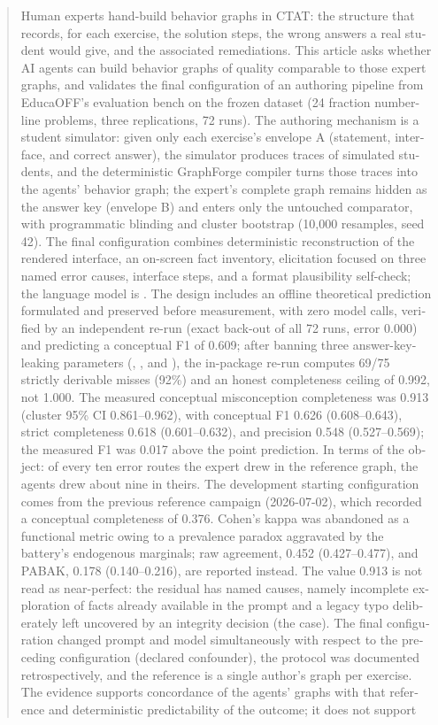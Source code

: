 \documentclass[11pt,a4paper]{article}
\begin{document}
\begin{otherlanguage}{english}
\renewcommand{\abstractname}{Abstract}
\begin{abstract}
Human experts hand-build behavior graphs in CTAT: the structure that records, for each exercise, the solution steps, the wrong answers a real student would give, and the associated remediations. This article asks whether AI agents can build behavior graphs of quality comparable to those expert graphs, and validates the final configuration of an authoring pipeline from EducaOFF's evaluation bench on the frozen dataset  (24 fraction number-line problems, three replications, 72 runs). The authoring mechanism is a student simulator: given only each exercise's envelope A (statement, interface, and correct answer), the simulator produces traces of simulated students, and the deterministic GraphForge compiler turns those traces into the agents' behavior graph; the expert's complete graph remains hidden as the answer key (envelope B) and enters only the untouched comparator, with programmatic blinding and cluster bootstrap (10,000 resamples, seed 42). The final configuration combines deterministic reconstruction of the rendered interface, an on-screen fact inventory, elicitation focused on three named error causes, interface steps, and a format plausibility self-check; the language model is . The design includes an offline theoretical prediction formulated and preserved before measurement, with zero model calls, verified by an independent re-run (exact back-out of all 72 runs, error 0.000) and predicting a conceptual F1 of 0.609; after banning three answer-key-leaking parameters (, , and ), the in-package re-run computes 69/75 strictly derivable misses (92\%) and an honest completeness ceiling of 0.992, not 1.000. The measured conceptual misconception completeness was 0.913 (cluster 95\% CI 0.861--0.962), with conceptual F1 0.626 (0.608--0.643), strict completeness 0.618 (0.601--0.632), and precision 0.548 (0.527--0.569); the measured F1 was 0.017 above the point prediction. In terms of the object: of every ten error routes the expert drew in the reference graph, the agents drew about nine in theirs. The development starting configuration comes from the previous reference campaign (2026-07-02), which recorded a conceptual completeness of 0.376. Cohen's kappa was abandoned as a functional metric owing to a prevalence paradox aggravated by the battery's endogenous marginals; raw agreement, 0.452 (0.427--0.477), and PABAK, 0.178 (0.140--0.216), are reported instead. The value 0.913 is not read as near-perfect: the residual has named causes, namely incomplete exploration of facts already available in the prompt and a legacy typo deliberately left uncovered by an integrity decision (the  case). The final configuration changed prompt and model simultaneously with respect to the preceding configuration (declared confounder), the protocol was documented retrospectively, and the reference is a single author's graph per exercise. The evidence supports concordance of the agents' graphs with that reference and deterministic predictability of the outcome; it does not support 
\end{abstract}
\end{otherlanguage}
\end{document}
